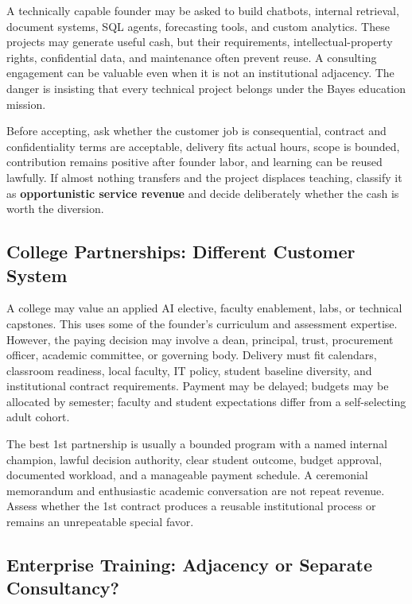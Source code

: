 A technically capable founder may be asked to build chatbots, internal retrieval, document systems, SQL agents, forecasting tools, and custom analytics. These projects may generate useful cash, but their requirements, intellectual-property rights, confidential data, and maintenance often prevent reuse. A consulting engagement can be valuable even when it is not an institutional adjacency. The danger is insisting that every technical project belongs under the Bayes education mission.

Before accepting, ask whether the customer job is consequential, contract and confidentiality terms are acceptable, delivery fits actual hours, scope is bounded, contribution remains positive after founder labor, and learning can be reused lawfully. If almost nothing transfers and the project displaces teaching, classify it as \textbf{opportunistic service revenue} and decide deliberately whether the cash is worth the diversion.

\subsection{College Partnerships: Different Customer System}
\label{sec:college_partnerships_different_system}

A college may value an applied AI elective, faculty enablement, labs, or technical capstones. This uses some of the founder's curriculum and assessment expertise. However, the paying decision may involve a dean, principal, trust, procurement officer, academic committee, or governing body. Delivery must fit calendars, classroom readiness, local faculty, IT policy, student baseline diversity, and institutional contract requirements. Payment may be delayed; budgets may be allocated by semester; faculty and student expectations differ from a self-selecting adult cohort.

The best 1st partnership is usually a bounded program with a named internal champion, lawful decision authority, clear student outcome, budget approval, documented workload, and a manageable payment schedule. A ceremonial memorandum and enthusiastic academic conversation are not repeat revenue. Assess whether the 1st contract produces a reusable institutional process or remains an unrepeatable special favor.

\subsection{Enterprise Training: Adjacency or Separate Consultancy?}
\label{sec:enterprise_training_adjacency_or_consultancy}

